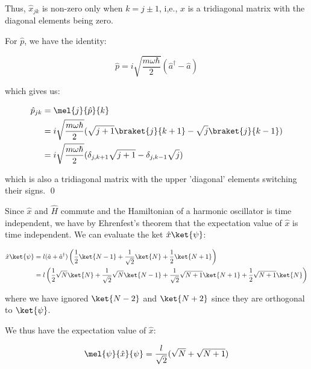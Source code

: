 \documentclass[12pt]{article}
\begin{document}
Thus, $\hat{x}_{jk}$ is non-zero only when $k = j \pm 1$, i,e., $\hat{x}$ is a tridiagonal matrix with the diagonal elements being zero.

For $\hat{p}$, we have the identity:

\begin{equation}
    \hat{p} = i \sqrt{\frac{m\omega \hbar}{2}} (\hat{a}^{\dagger} - \hat{a})
\end{equation}

which gives us:

\begin{equation}
    \begin{split}
        \hat{p}_{jk} &= \mel{j}{\hat{p}}{k} \\
        &= i \sqrt{\frac{m\omega \hbar}{2}} (\sqrt{j + 1} \braket{j}{k + 1} - \sqrt{j} \braket{j}{k - 1}) \\
        &= i \sqrt{\frac{m\omega \hbar}{2}} (\delta_{j, k + 1} \sqrt{j + 1} - \delta_{j, k - 1} \sqrt{j})
    \end{split}
\end{equation}

which is also a tridiagonal matrix with the upper 'diagonal' elements switching their signs.
\qed


Since $\hat{x}$ and $\hat{H}$ commute and the Hamiltonian of a harmonic oscillator is time independent, we have by Ehrenfest's theorem that the expectation value of $\hat{x}$ is time independent. We can evaluate the ket $\hat{x} \ket{\psi}$:

\begin{equation}
    \begin{split}
        \hat{x} \ket{\psi} &= l(\hat{a} + \hat{a}^{\dagger}) \left( \frac{1}{2} \ket{N - 1} + \frac{1}{\sqrt{2}} \ket{N} + \frac{1}{2} \ket{N + 1} \right) \\
        &= l \left( \frac{1}{2} \sqrt{N} \ket{N} + \frac{1}{\sqrt{2}} \sqrt{N} \ket{N - 1} + \frac{1}{\sqrt{2}} \sqrt{N + 1} \ket{N + 1} + \frac{1}{2} \sqrt{N + 1} \ket{N} \right) \\
    \end{split}
\end{equation}

where we have ignored $\ket{N - 2}$ and $\ket{N + 2}$ since they are orthogonal to $\ket{\psi}$.

We thus have the expectation value of $\hat{x}$:

\begin{equation}
    \mel{\psi}{\hat{x}}{\psi} = \frac{l}{\sqrt{2}} (\sqrt{N} + \sqrt{N + 1})
\end{equation}
\end{document}
